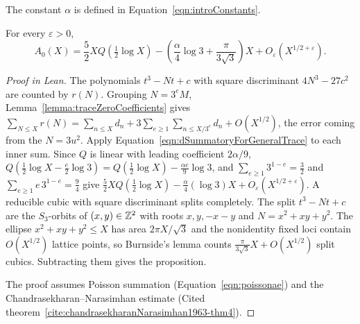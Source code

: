 \begin{proposition}

\label{prop:traceZeroAsymptotic}


\leanok

The constant $\alpha$ is defined in Equation~\ref{eqn:introConstants}.

 For every $\varepsilon>0$, \[ A_0(X) =\frac52XQ\left(\tfrac12\log X\right) -\left(\frac{\alpha}{4}\log3+\frac{\pi}{3\sqrt3}\right)X +O_\varepsilon(X^{1/2+\varepsilon}). \] 

\end{proposition}

\begin{proof}[Proof in Lean]

\leanok


The polynomials $t^3-Nt+c$ with square discriminant $4N^3-27c^2$ are counted by $r(N)$. Grouping $N=3^eM$, Lemma~\ref{lemma:traceZeroCoefficients} gives $\sum_{N\leq X}r(N)=\sum_{n\leq X}d_n+3\sum_{e\geq1}\sum_{n\leq X/3^e}d_n+O(X^{1/2})$, the error coming from the $N=3u^2$. Apply Equation~\ref{eqn:dSummatoryForGeneralTrace} to each inner sum. Since $Q$ is linear with leading coefficient $2\alpha/9$, $Q(\frac12\log X-\frac e2\log3)=Q(\frac12\log X)-\frac{\alpha e}9\log3$, and $\sum_{e\geq1}3^{1-e}=\frac32$ and $\sum_{e\geq1}e\,3^{1-e}=\frac94$ give $\frac52XQ(\frac12\log X)-\frac\alpha4(\log3)X+O_\varepsilon(X^{1/2+\varepsilon})$. A reducible cubic with square discriminant splits completely. The split $t^3-Nt+c$ are the $S_3$-orbits of $(x,y)\in\mathbb{Z}^2$ with roots $x,y,-x-y$ and $N=x^2+xy+y^2$. The ellipse $x^2+xy+y^2\leq X$ has area $2\pi X/\sqrt3$ and the nonidentity fixed loci contain $O(X^{1/2})$ lattice points, so Burnside's lemma counts $\frac{\pi}{3\sqrt3}X+O(X^{1/2})$ split cubics. Subtracting them gives the proposition.

The proof assumes Poisson summation (Equation~\ref{eqn:poissonae}) and the Chandrasekharan--Narasimhan estimate (Cited theorem~\ref{cite:chandrasekharanNarasimhan1963-thm4}).

\end{proof}

